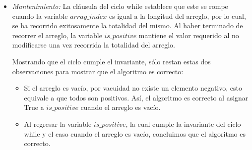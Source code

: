 \documentclass[a4paper, 12pt]{report}
\begin{document}
\begin{enumerate}
{\begin{enumerate}
\begin{itemize}
\begin{itemize}
                    es FALSE, la operación $\&$ regresa FALSE lo cual se asigna
                    a
                    la variable $is\_positive$, así, $is\_positive$ cumple
                    el invariante, al ser FALSE cuando se acaba de hallar un
                    número negativo.
                \item Si $is\_positive$ era FALSE, y el valor de la comparación
                    es TRUE, la operación $\&$ regresa FALSE lo cual se asigna
                    a
                    la variable $is\_positive$, así, $is\_positive$ cumple
                    el invariante, al continuar siendo FALSE por haberse
                    hallado previamente un número negativo.
            \end{itemize}
            Al fin del ciclo, se incrementa $array\_index$ en una unidad, lo
            cual permite continuar con la iteración.
        \item {\it Mantenimiento:}
            La cláusula del ciclo while establece que este se rompe cuando la
            variable $array\_index$ es igual a la longitud del arreglo, por lo
            cual, se ha recorrido exitosamente la totalidad del mismo. Al
            haber terminado de recorrer el arreglo, la variable $is\_positive$
            mantiene el valor requerido al no modificarse una vez recorrida la
            totalidad del arreglo.

        Mostrando que el ciclo cumple el invariante, sólo restan estas dos
        observaciones para mostrar que el algoritmo es correcto:
        \begin{itemize}
            \item Si el arreglo es vacío, por vacuidad no existe un elemento
                negativo, esto equivale a que todos son positivos. Así,
                el algoritmo es correcto al asignar True a $is\_positive$
                cuando el arreglo es vacío.

            \item Al regresar la variable $is\_positive$, la cual cumple la
                invariante del ciclo while y el caso cuando el arreglo es vacío,
                concluimos que el algoritmo es correcto.
        \end{itemize}
    \end{itemize}


\end{enumerate}}
\end{enumerate}
\end{document}
